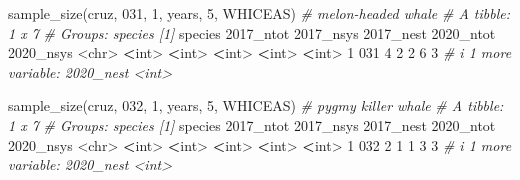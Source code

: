\documentclass[
]{book}
\newenvironment{Shaded}{\begin{snugshade}}{\end{snugshade}}
\newcommand{\AttributeTok}[1]{\textcolor[rgb]{0.77,0.63,0.00}{#1}}
\newcommand{\CommentTok}[1]{\textcolor[rgb]{0.56,0.35,0.01}{\textit{#1}}}
\newcommand{\DecValTok}[1]{\textcolor[rgb]{0.00,0.00,0.81}{#1}}
\newcommand{\ErrorTok}[1]{\textcolor[rgb]{0.64,0.00,0.00}{\textbf{#1}}}
\newcommand{\FunctionTok}[1]{\textcolor[rgb]{0.00,0.00,0.00}{#1}}
\newcommand{\NormalTok}[1]{#1}
\newcommand{\SpecialCharTok}[1]{\textcolor[rgb]{0.00,0.00,0.00}{#1}}
\newcommand{\StringTok}[1]{\textcolor[rgb]{0.31,0.60,0.02}{#1}}
\begin{document}
\begin{Shaded}
\begin{Highlighting}[]
\FunctionTok{sample\_size}\NormalTok{(cruz, }\StringTok{\textquotesingle{}031\textquotesingle{}}\NormalTok{, }\DecValTok{1}\NormalTok{, years, }\DecValTok{5}\NormalTok{, }\StringTok{\textquotesingle{}WHICEAS\textquotesingle{}}\NormalTok{) }\CommentTok{\# melon{-}headed whale}
\CommentTok{\# A tibble: 1 x 7}
\CommentTok{\# Groups:   species [1]}
\NormalTok{  species }\StringTok{\textasciigrave{}}\AttributeTok{2017\_ntot}\StringTok{\textasciigrave{}} \StringTok{\textasciigrave{}}\AttributeTok{2017\_nsys}\StringTok{\textasciigrave{}} \StringTok{\textasciigrave{}}\AttributeTok{2017\_nest}\StringTok{\textasciigrave{}} \StringTok{\textasciigrave{}}\AttributeTok{2020\_ntot}\StringTok{\textasciigrave{}} \StringTok{\textasciigrave{}}\AttributeTok{2020\_nsys}\StringTok{\textasciigrave{}}
  \SpecialCharTok{\textless{}}\NormalTok{chr}\SpecialCharTok{\textgreater{}}         \ErrorTok{\textless{}}\NormalTok{int}\SpecialCharTok{\textgreater{}}       \ErrorTok{\textless{}}\NormalTok{int}\SpecialCharTok{\textgreater{}}       \ErrorTok{\textless{}}\NormalTok{int}\SpecialCharTok{\textgreater{}}       \ErrorTok{\textless{}}\NormalTok{int}\SpecialCharTok{\textgreater{}}       \ErrorTok{\textless{}}\NormalTok{int}\SpecialCharTok{\textgreater{}}
\DecValTok{1} \DecValTok{031}               \DecValTok{4}           \DecValTok{2}           \DecValTok{2}           \DecValTok{6}           \DecValTok{3}
\CommentTok{\# i 1 more variable: \textasciigrave{}2020\_nest\textasciigrave{} \textless{}int\textgreater{}}

\FunctionTok{sample\_size}\NormalTok{(cruz, }\StringTok{\textquotesingle{}032\textquotesingle{}}\NormalTok{, }\DecValTok{1}\NormalTok{, years, }\DecValTok{5}\NormalTok{, }\StringTok{\textquotesingle{}WHICEAS\textquotesingle{}}\NormalTok{) }\CommentTok{\# pygmy killer whale}
\CommentTok{\# A tibble: 1 x 7}
\CommentTok{\# Groups:   species [1]}
\NormalTok{  species }\StringTok{\textasciigrave{}}\AttributeTok{2017\_ntot}\StringTok{\textasciigrave{}} \StringTok{\textasciigrave{}}\AttributeTok{2017\_nsys}\StringTok{\textasciigrave{}} \StringTok{\textasciigrave{}}\AttributeTok{2017\_nest}\StringTok{\textasciigrave{}} \StringTok{\textasciigrave{}}\AttributeTok{2020\_ntot}\StringTok{\textasciigrave{}} \StringTok{\textasciigrave{}}\AttributeTok{2020\_nsys}\StringTok{\textasciigrave{}}
  \SpecialCharTok{\textless{}}\NormalTok{chr}\SpecialCharTok{\textgreater{}}         \ErrorTok{\textless{}}\NormalTok{int}\SpecialCharTok{\textgreater{}}       \ErrorTok{\textless{}}\NormalTok{int}\SpecialCharTok{\textgreater{}}       \ErrorTok{\textless{}}\NormalTok{int}\SpecialCharTok{\textgreater{}}       \ErrorTok{\textless{}}\NormalTok{int}\SpecialCharTok{\textgreater{}}       \ErrorTok{\textless{}}\NormalTok{int}\SpecialCharTok{\textgreater{}}
\DecValTok{1} \DecValTok{032}               \DecValTok{2}           \DecValTok{1}           \DecValTok{1}           \DecValTok{3}           \DecValTok{3}
\CommentTok{\# i 1 more variable: \textasciigrave{}2020\_nest\textasciigrave{} \textless{}int\textgreater{}}


\end{Highlighting}
\end{Shaded}
\end{document}
